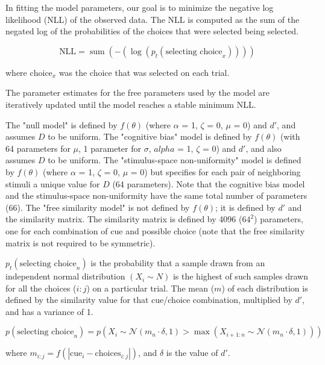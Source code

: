 In fitting the model parameters, our goal is to minimize the negative log likelihood (NLL) of the observed data. 
The NLL is computed as the sum of the negated log of the probabilities of the choices that were selected being selected. 

\begin{equation}
    \text{NLL} = \operatorname{sum}\left(-\left(\log \left(p_t\left(\text {selecting choice}_x\right)\right)\right)\right)
\end{equation}

where $\text{choice}_x$ was the choice that was selected on each trial.

The parameter estimates for the free parameters used by the model are iteratively updated until the model reaches a stable minimum NLL. 

The "null model" is defined by $f(\theta)$ (where $\alpha$ = 1, $\zeta$ = 0, $\mu$ = 0) and $d'$, and assumes $D$ to be uniform. 
The "cognitive bias" model is defined by $f(\theta)$ (with 64 parameters for $\mu$, 1 parameter for $\sigma$, $alpha$ = 1, $\zeta$ = 0) and $d'$, and also assumes $D$ to be uniform. 
The "stimulus-space non-uniformity" model is defined by $f(\theta)$ (where $\alpha$ = 1, $\zeta$ = 0, $\mu$ = 0) but specifies for each pair of neighboring stimuli a unique value for $D$ (64 parameters). 
Note that the cognitive bias model and the stimulus-space non-uniformity have the same total number of parameters (66). 
The "free similarity model" is not defined by $f(\theta)$; it is defined by $d'$ and the similarity matrix. 
The similarity matrix is defined by 4096 ($64^2$) parameters, one for each combination of cue and possible choice (note that the free similarity matrix is not required to be symmetric).

$p_t(\text{selecting choice}_n)$ is the probability that a sample drawn from an independent normal distribution $(X_i \sim N)$ is the highest of such samples drawn for all the choices ($i:j$) on a particular trial. 
The mean ($m$) of each distribution is defined by the similarity value for that cue/choice combination, multiplied by $d'$, and has a variance of 1.

\begin{equation}
    p\left(\text{selecting choice}_n\right) = 
    p\left(X_i \sim \mathcal{N}\left(m_n \cdot \delta, 1\right)
    >\max 
    \left(X_{i+1: n} \sim \mathcal{N}\left(m_n \cdot \delta, 1\right)\right)\right)
\end{equation}

where $m_{i:j} = f\left(|\text{cue}_{i} - \text{choices}_{i:j}|\right)$, and $\delta$ is the value of $d'$.

